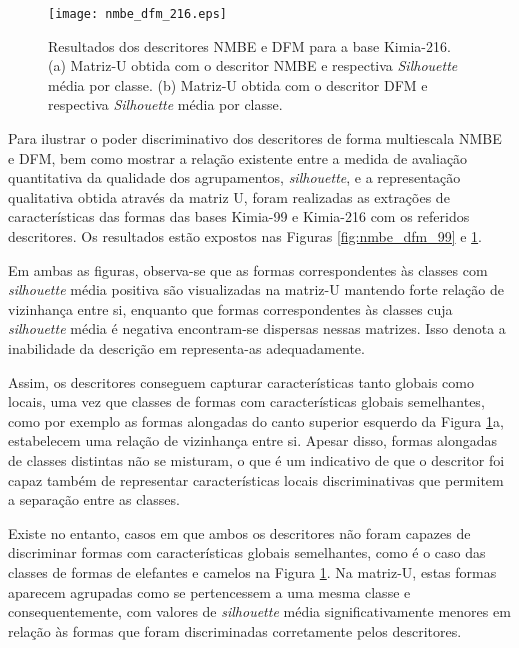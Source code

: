 \begin{figure}[t]
 \caption{\label{fig:nmbe_dfm_216} Resultados dos descritores NMBE e DFM para a base Kimia-216. (a) Matriz-U obtida com o descritor NMBE e respectiva \textit{Silhouette} média por classe. (b) Matriz-U obtida com o descritor DFM e respectiva \textit{Silhouette} média por classe.}
  \centering
  \texttt{[image: nmbe\_dfm\_216.eps]}
\end{figure}

Para ilustrar o poder discriminativo dos descritores de forma multiescala NMBE e DFM, bem como mostrar a relação existente entre a medida de avaliação quantitativa da qualidade dos agrupamentos, \emph{silhouette}, e a representação qualitativa obtida através da matriz U, foram realizadas as extrações de características das formas das bases Kimia-99 e Kimia-216 com os referidos descritores. Os resultados estão expostos nas Figuras \ref{fig:nmbe_dfm_99} e \ref{fig:nmbe_dfm_216}. 

Em ambas as figuras, observa-se que as formas correspondentes às classes com  \emph{silhouette} média positiva são visualizadas na matriz-U mantendo forte relação de vizinhança entre si, enquanto que formas correspondentes às classes cuja \emph{silhouette} média é negativa encontram-se dispersas nessas matrizes. Isso denota a inabilidade da descrição  em representa-as adequadamente.

Assim, os descritores conseguem capturar características tanto globais como locais, uma vez que classes de formas com características globais semelhantes, como por exemplo as formas alongadas do canto superior esquerdo da Figura \ref{fig:nmbe_dfm_216}a, estabelecem uma relação de vizinhança entre si. Apesar disso, formas alongadas de classes distintas não se misturam, o que é um indicativo de que o descritor foi capaz também de representar características locais discriminativas que permitem a separação entre as classes.

Existe no entanto,  casos em que ambos os descritores não foram capazes de discriminar formas com características globais semelhantes, como é o caso das classes de formas de elefantes e camelos na Figura \ref{fig:nmbe_dfm_216}. Na matriz-U, estas formas aparecem agrupadas como se pertencessem a uma mesma classe e consequentemente, com valores de \emph{silhouette} média significativamente menores em relação às formas que foram discriminadas corretamente pelos descritores.

